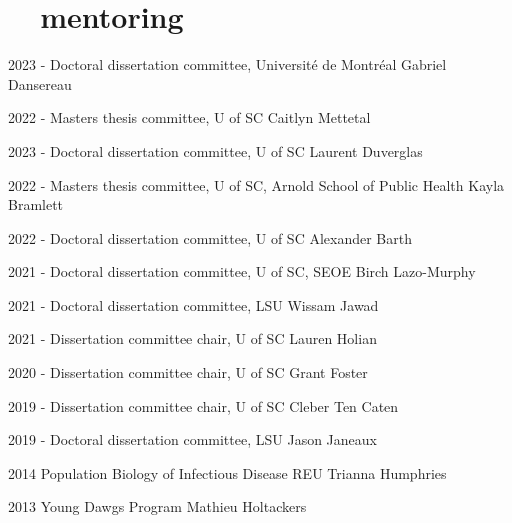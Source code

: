 \documentclass[]{CV}
\begin{document}
{\begin{entrylist}
\end{entrylist}















\section{\faUsers \ \ mentoring}
\begin{entrylist}

 \entry
  {2023 - }
  {Doctoral dissertation committee, Université de Montréal}
  {Gabriel Dansereau}

 \entry
  {2022 - }
  {Masters thesis committee, U of SC}
  {Caitlyn Mettetal}
  
 \entry
  {2023 - }
  {Doctoral dissertation committee, U of SC}
  {Laurent Duverglas}
   
 \entry
 {2022 - }
 {Masters thesis committee, U of SC, Arnold School of Public Health}
 {Kayla Bramlett}
 
 \entry
 {2022 - }
 {Doctoral dissertation committee, U of SC}
 {Alexander Barth}

 \entry
 {2021 - }
 {Doctoral dissertation committee, U of SC, SEOE}
 {Birch Lazo-Murphy}

 \entry
 {2021 - }
 {Doctoral dissertation committee, LSU}
 {Wissam Jawad}

 \entry
 {2021 - }
 {Dissertation committee chair, U of SC}
 {Lauren Holian}

 \entry
 {2020 - }
 {Dissertation committee chair, U of SC}
 {Grant Foster}

 \entry
 {2019 - }
 {Dissertation committee chair, U of SC}
 {Cleber Ten Caten}
 
 \entry
 {2019 - }
 {Doctoral dissertation committee, LSU}
 {Jason Janeaux}

 \entry
 {2014}
 {Population Biology of Infectious Disease REU}
 {Trianna Humphries}

 \entry
 {2013}
 {Young Dawgs Program}
 {Mathieu Holtackers}

\end{entrylist}












}
\end{document}
